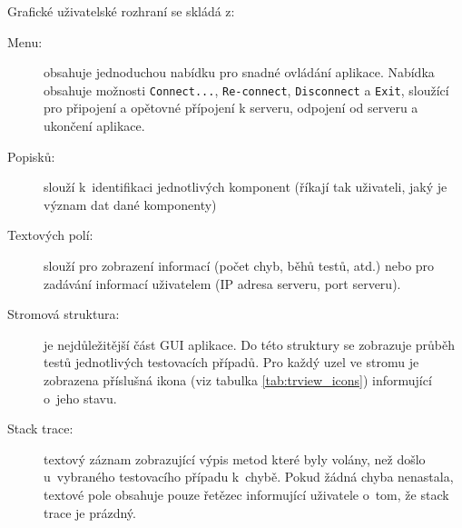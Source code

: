       \noindent Grafické uživatelské rozhraní se skládá z:
      \begin{description}
	 \item[Menu:] obsahuje jednoduchou nabídku pro snadné ovládání aplikace. Nabídka obsahuje možnosti \texttt{Connect...}, \texttt{Re-connect}, \texttt{Disconnect} a \texttt{Exit}, sloužící pro připojení a opětovné přípojení k serveru, odpojení od serveru a ukončení aplikace.
	 \item[Popisků:] slouží k~identifikaci jednotlivých komponent (říkají tak uživateli, jaký je význam dat dané komponenty)
	 \item[Textových polí:] slouží pro zobrazení informací (počet chyb, běhů testů, atd.) nebo pro zadávání informací uživatelem (IP adresa serveru, port serveru).
	 \item[Stromová struktura:] je nejdůležitější část GUI aplikace. Do této struktury se zobrazuje průběh testů jednotlivých testovacích případů. Pro každý uzel ve stromu je zobrazena příslušná ikona (viz tabulka \ref{tab:trview_icons}) informující o~jeho stavu.
	 \item[Stack trace:] textový záznam zobrazující výpis metod které byly volány, než došlo u~vybraného testovacího případu k~chybě. Pokud žádná chyba nenastala, textové pole obsahuje pouze řetězec informující uživatele o~tom, že stack trace je prázdný.
      \end{description}

